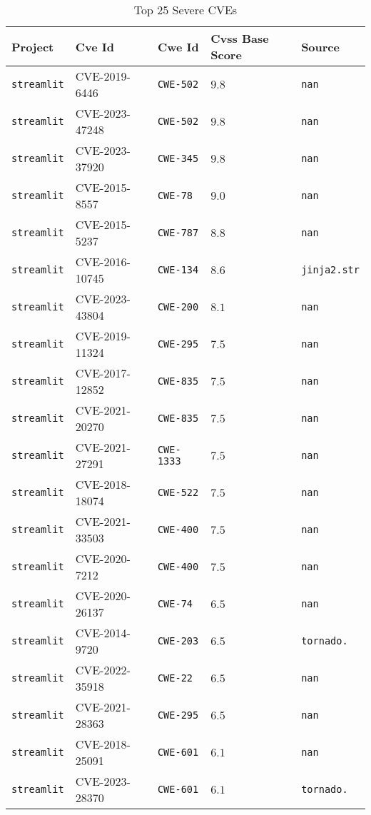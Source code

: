 \begin{table}
\caption{Top 25 Severe CVEs}
\label{tab:most-severe-cwe}
\begin{tabular}{lllll}
\toprule
Project & Cve Id & Cwe Id & Cvss Base Score & Source \\
\midrule
\texttt{streamlit} & CVE-2019-6446 & \texttt{CWE-502} & $9.8$ & \texttt{nan} \\
\texttt{streamlit} & CVE-2023-47248 & \texttt{CWE-502} & $9.8$ & \texttt{nan} \\
\texttt{streamlit} & CVE-2023-37920 & \texttt{CWE-345} & $9.8$ & \texttt{nan} \\
\texttt{streamlit} & CVE-2015-8557 & \texttt{CWE-78} & $9.0$ & \texttt{nan} \\
\texttt{streamlit} & CVE-2015-5237 & \texttt{CWE-787} & $8.8$ & \texttt{nan} \\
\texttt{streamlit} & CVE-2016-10745 & \texttt{CWE-134} & $8.6$ & \texttt{jinja2.str} \\
\texttt{streamlit} & CVE-2023-43804 & \texttt{CWE-200} & $8.1$ & \texttt{nan} \\
\texttt{streamlit} & CVE-2019-11324 & \texttt{CWE-295} & $7.5$ & \texttt{nan} \\
\texttt{streamlit} & CVE-2017-12852 & \texttt{CWE-835} & $7.5$ & \texttt{nan} \\
\texttt{streamlit} & CVE-2021-20270 & \texttt{CWE-835} & $7.5$ & \texttt{nan} \\
\texttt{streamlit} & CVE-2021-27291 & \texttt{CWE-1333} & $7.5$ & \texttt{nan} \\
\texttt{streamlit} & CVE-2018-18074 & \texttt{CWE-522} & $7.5$ & \texttt{nan} \\
\texttt{streamlit} & CVE-2021-33503 & \texttt{CWE-400} & $7.5$ & \texttt{nan} \\
\texttt{streamlit} & CVE-2020-7212 & \texttt{CWE-400} & $7.5$ & \texttt{nan} \\
\texttt{streamlit} & CVE-2020-26137 & \texttt{CWE-74} & $6.5$ & \texttt{nan} \\
\texttt{streamlit} & CVE-2014-9720 & \texttt{CWE-203} & $6.5$ & \texttt{tornado.} \\
\texttt{streamlit} & CVE-2022-35918 & \texttt{CWE-22} & $6.5$ & \texttt{nan} \\
\texttt{streamlit} & CVE-2021-28363 & \texttt{CWE-295} & $6.5$ & \texttt{nan} \\
\texttt{streamlit} & CVE-2018-25091 & \texttt{CWE-601} & $6.1$ & \texttt{nan} \\
\texttt{streamlit} & CVE-2023-28370 & \texttt{CWE-601} & $6.1$ & \texttt{tornado.} \\

\end{tabular}
\end{table}
